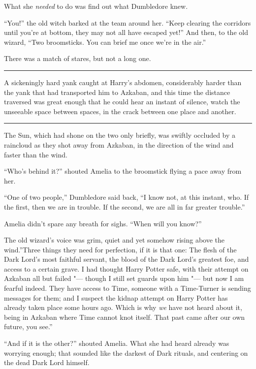 What she \emph{needed} to do was find out what Dumbledore knew.

``You!'' the old witch barked at the team around her. ``Keep clearing
the corridors until you're at bottom, they may not all have escaped
yet!'' And then, to the old wizard, ``Two broomsticks. You can brief me
once we're in the air.''

There was a match of stares, but not a long one.

\begin{center}\rule{3in}{0.4pt}\end{center}

A sickeningly hard yank caught at Harry's abdomen, considerably harder
than the yank that had transported him to Azkaban, and this time the
distance traversed was great enough that he could hear an instant of
silence, watch the unseeable space between spaces, in the crack between
one place and another.

\begin{center}\rule{3in}{0.4pt}\end{center}

The Sun, which had shone on the two only briefly, was swiftly occluded
by a raincloud as they shot away from Azkaban, in the direction of the
wind and faster than the wind.

``Who's behind it?'' shouted Amelia to the broomstick flying a pace away
from her.

``One of two people,'' Dumbledore said back, ``I know not, at this
instant, who. If the first, then we are in trouble. If the second, we
are all in far greater trouble.''

Amelia didn't spare any breath for sighs. ``When will you know?''

The old wizard's voice was grim, quiet and yet somehow rising above the
wind.''Three things they need for perfection, if it is that one: The
flesh of the Dark Lord's most faithful servant, the blood of the Dark
Lord's greatest foe, and access to a certain grave. I had thought Harry
Potter safe, with their attempt on Azkaban all but failed "--- though I
still set guards upon him "--- but now I am fearful indeed. They have
access to Time, someone with a Time-Turner is sending messages for them;
and I suspect the kidnap attempt on Harry Potter has already taken place
some hours ago. Which is why \emph{we} have not heard about it, being in
Azkaban where Time cannot knot itself. That past came after our own
future, you see.''

``And if it is the other?'' shouted Amelia. What she had heard already
was worrying enough; that sounded like the darkest of Dark rituals, and
centering on the dead Dark Lord himself.

